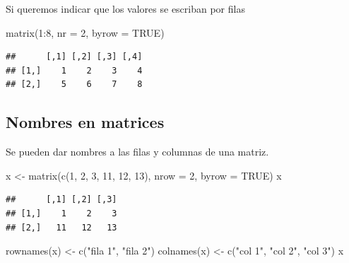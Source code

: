 \documentclass[
]{book}
\newenvironment{Shaded}{\begin{snugshade}}{\end{snugshade}}
\newcommand{\AttributeTok}[1]{\textcolor[rgb]{0.77,0.63,0.00}{#1}}
\newcommand{\ConstantTok}[1]{\textcolor[rgb]{0.00,0.00,0.00}{#1}}
\newcommand{\DecValTok}[1]{\textcolor[rgb]{0.00,0.00,0.81}{#1}}
\newcommand{\FunctionTok}[1]{\textcolor[rgb]{0.00,0.00,0.00}{#1}}
\newcommand{\NormalTok}[1]{#1}
\newcommand{\OtherTok}[1]{\textcolor[rgb]{0.56,0.35,0.01}{#1}}
\newcommand{\SpecialCharTok}[1]{\textcolor[rgb]{0.00,0.00,0.00}{#1}}
\newcommand{\StringTok}[1]{\textcolor[rgb]{0.31,0.60,0.02}{#1}}
\theoremstyle{break}
\begin{document}
Si queremos indicar que los valores se escriban por filas

\begin{Shaded}
\begin{Highlighting}[]
\FunctionTok{matrix}\NormalTok{(}\DecValTok{1}\SpecialCharTok{:}\DecValTok{8}\NormalTok{, }\AttributeTok{nr =} \DecValTok{2}\NormalTok{, }\AttributeTok{byrow =} \ConstantTok{TRUE}\NormalTok{)}
\end{Highlighting}
\end{Shaded}

\begin{verbatim}
##      [,1] [,2] [,3] [,4]
## [1,]    1    2    3    4
## [2,]    5    6    7    8
\end{verbatim}

\hypertarget{nombres-en-matrices}{%
\subsection{Nombres en matrices}\label{nombres-en-matrices}}

Se pueden dar nombres a las filas y columnas de una matriz.

\begin{Shaded}
\begin{Highlighting}[]
\NormalTok{x }\OtherTok{\textless{}{-}} \FunctionTok{matrix}\NormalTok{(}\FunctionTok{c}\NormalTok{(}\DecValTok{1}\NormalTok{, }\DecValTok{2}\NormalTok{, }\DecValTok{3}\NormalTok{, }\DecValTok{11}\NormalTok{, }\DecValTok{12}\NormalTok{, }\DecValTok{13}\NormalTok{), }\AttributeTok{nrow =} \DecValTok{2}\NormalTok{, }\AttributeTok{byrow =} \ConstantTok{TRUE}\NormalTok{)}
\NormalTok{x}
\end{Highlighting}
\end{Shaded}

\begin{verbatim}
##      [,1] [,2] [,3]
## [1,]    1    2    3
## [2,]   11   12   13
\end{verbatim}

\begin{Shaded}
\begin{Highlighting}[]
\FunctionTok{rownames}\NormalTok{(x) }\OtherTok{\textless{}{-}} \FunctionTok{c}\NormalTok{(}\StringTok{"fila 1"}\NormalTok{, }\StringTok{"fila 2"}\NormalTok{)}
\FunctionTok{colnames}\NormalTok{(x) }\OtherTok{\textless{}{-}} \FunctionTok{c}\NormalTok{(}\StringTok{"col 1"}\NormalTok{, }\StringTok{"col 2"}\NormalTok{, }\StringTok{"col 3"}\NormalTok{)}
\NormalTok{x }
\end{Highlighting}
\end{Shaded}
\end{document}

